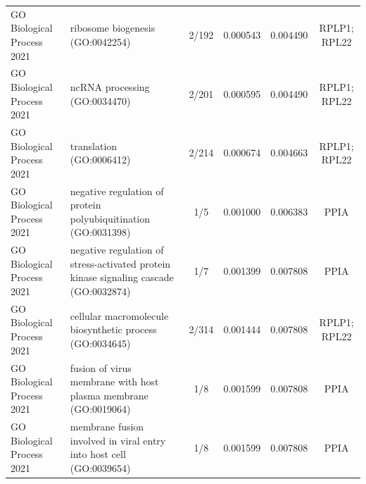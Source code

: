 \documentclass{article}
\begin{document}
\begin{table}[H]
{\begin{tabular}{@{}llcccc@{}}
              GO Biological Process 2021 & ribosome biogenesis (GO:0042254) & 2/192 & 0.000543 & 0.004490 & RPLP1; RPL22 \\
              GO Biological Process 2021 & ncRNA processing (GO:0034470) & 2/201 & 0.000595 & 0.004490 & RPLP1; RPL22 \\
              GO Biological Process 2021 & translation (GO:0006412) & 2/214 & 0.000674 & 0.004663 & RPLP1; RPL22 \\
              GO Biological Process 2021 & negative regulation of protein polyubiquitination (GO:0031398) & 1/5   & 0.001000 & 0.006383 & PPIA \\
              GO Biological Process 2021 & negative regulation of stress-activated protein kinase signaling cascade (GO:0032874) & 1/7   & 0.001399 & 0.007808 & PPIA \\
              GO Biological Process 2021 & cellular macromolecule biosynthetic process (GO:0034645) & 2/314 & 0.001444 & 0.007808 & RPLP1; RPL22 \\
              GO Biological Process 2021 & fusion of virus membrane with host plasma membrane (GO:0019064) & 1/8   & 0.001599 & 0.007808 & PPIA \\
              GO Biological Process 2021 & membrane fusion involved in viral entry into host cell (GO:0039654) & 1/8   & 0.001599 & 0.007808 & PPIA \\ \bottomrule
            \end{tabular}
          }

        \end{table}
\end{document}
